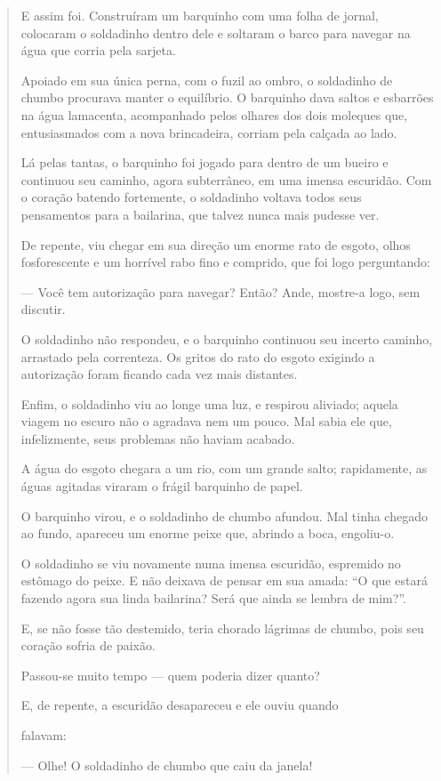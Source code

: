 \begin{escolha}
\begin{escolha}
{\begin{escolha}
\begin{quote}
E assim foi. Construíram um barquinho com uma folha de jornal, colocaram
o soldadinho dentro dele e soltaram o barco para navegar na água que
corria pela sarjeta.

Apoiado em sua única perna, com o fuzil ao ombro, o soldadinho de chumbo
procurava manter o equilíbrio. O barquinho dava saltos e esbarrões na
água lamacenta, acompanhado pelos olhares dos dois moleques que,
entusiasmados com a nova brincadeira, corriam pela calçada ao lado.

Lá pelas tantas, o barquinho foi jogado para dentro de um bueiro e
continuou seu caminho, agora subterrâneo, em uma imensa escuridão. Com o
coração batendo fortemente, o soldadinho voltava todos seus pensamentos
para a bailarina, que talvez nunca mais pudesse ver.

De repente, viu chegar em sua direção um enorme rato de esgoto, olhos
fosforescente e um horrível rabo fino e comprido, que foi logo
perguntando:

--- Você tem autorização para navegar? Então? Ande, mostre-a logo, sem
discutir.

O soldadinho não respondeu, e o barquinho continuou seu incerto caminho,
arrastado pela correnteza. Os gritos do rato do esgoto exigindo a
autorização foram ficando cada vez mais distantes.

Enfim, o soldadinho viu ao longe uma luz, e respirou aliviado; aquela
viagem no escuro não o agradava nem um pouco. Mal sabia ele que,
infelizmente, seus problemas não haviam acabado.

A água do esgoto chegara a um rio, com um grande salto; rapidamente, as
águas agitadas viraram o frágil barquinho de papel.

O barquinho virou, e o soldadinho de chumbo afundou. Mal tinha chegado
ao fundo, apareceu um enorme peixe que, abrindo a boca, engoliu-o.

O soldadinho se viu novamente numa imensa escuridão, espremido no
estômago do peixe. E não deixava de pensar em sua amada: ``O que estará
fazendo agora sua linda bailarina? Será que ainda se lembra de mim?''.

E, se não fosse tão destemido, teria chorado lágrimas de chumbo, pois
seu coração sofria de paixão.

Passou-se muito tempo --- quem poderia dizer quanto?

E, de repente, a escuridão desapareceu e ele ouviu quando

falavam:

--- Olhe! O soldadinho de chumbo que caiu da janela!


\end{quote}
\end{escolha}}
\end{escolha}
\end{escolha}
